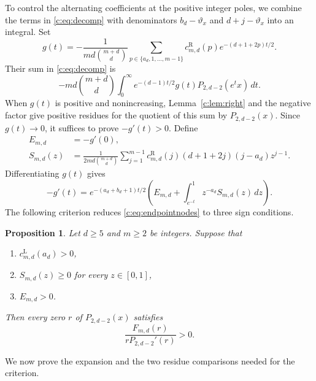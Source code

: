 \documentclass[10pt,a4paper]{article}
\numberwithin{equation}{section}
\newtheorem{proposition}[theorem]{Proposition}
\theoremstyle{remark}\newtheorem{remark}[theorem]{Remark}
\newcommand{\varthetax}{\vartheta_x}
\begin{document}
To control the alternating coefficients at the positive integer poles,
we combine the terms in \eqref{c:eq:decomp} with denominators
$b_d-\varthetax$ and $d+j-\varthetax$ into an integral. Set
\[
 g(t)=-\frac1{md\binom{m+d}{d}}
 \sum_{p\in\{a_d,1,\ldots,m-1\}}
 c_{m,d}^{\mathrm R}(p)e^{-(d+1+2p)t/2}.
\]
Their sum in \eqref{c:eq:decomp} is
\[
 -md\binom{m+d}{d}\int_0^\infty
 e^{-(d-1)t/2}g(t)P_{2,d-2}(e^tx)\,dt.
\]
When $g(t)$ is positive and nonincreasing, Lemma~\ref{c:lem:right} and the
negative factor give positive residues for the quotient of this sum
by $P_{2,d-2}(x)$.
Since $g(t)\to0$, it suffices to prove $-g'(t)>0$. Define
\begin{align*}
 E_{m,d}&=-g'(0),\\
 S_{m,d}(z)&=\frac1{2md\binom{m+d}{d}}\sum_{j=1}^{m-1}
 c_{m,d}^{\mathrm R}(j)(d+1+2j)(j-a_d)z^{j-1}.
\end{align*}
Differentiating $g(t)$ gives
\begin{equation}\label{c:eq:weightderivative}
 -g'(t)=e^{-(a_d+b_d+1)t/2}
 \left(E_{m,d}+\int_{e^{-t}}^1z^{-a_d}S_{m,d}(z)\,dz\right).
\end{equation}
The following criterion reduces \eqref{c:eq:endpointnodes} to three
sign conditions.

\begin{proposition}\label{c:th:criterion}
Let $d\ge5$ and $m\ge2$ be integers. Suppose that
\begin{enumerate}
\renewcommand{\theenumi}{\roman{enumi}}
\renewcommand{\labelenumi}{(\theenumi)}
\item\label{c:cond:left} $c_{m,d}^{\mathrm L}(a_d)>0$,
\item\label{c:cond:kernel} $S_{m,d}(z)\ge0$ for every $z\in[0,1]$,
\item\label{c:cond:gap} $E_{m,d}>0$.
\end{enumerate}
Then every zero $r$ of $P_{2,d-2}(x)$ satisfies
\[
 \frac{F_{m,d}(r)}{rP_{2,d-2}'(r)}>0.
\]
\end{proposition}
We now prove the expansion and the two residue comparisons needed for
the criterion.
\end{document}
